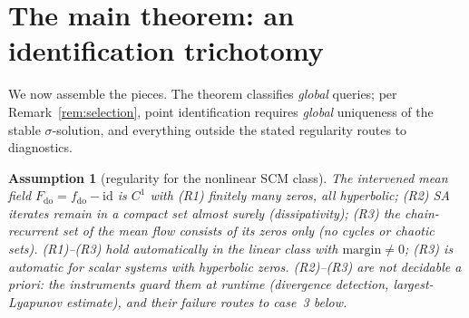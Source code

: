 \documentclass[pmlr]{jmlr}
\newtheorem{assumption}[theorem]{Assumption}
\newcommand{\doop}{\mathrm{do}}
\newcommand{\margin}{\mathrm{margin}}
\begin{document}
\section{The main theorem: an identification trichotomy}\label{sec:main}

We now assemble the pieces. The theorem classifies \emph{global} queries; per
Remark~\ref{rem:selection}, point identification requires \emph{global} uniqueness of the stable
$\sigma$-solution, and everything outside the stated regularity routes to diagnostics.

\begin{assumption}[regularity for the nonlinear SCM class]\label{ass:R}
The intervened mean field $F_{\doop} = f_{\doop} - \mathrm{id}$ is $C^1$ with (R1) finitely many
zeros, all hyperbolic; (R2) SA iterates remain in a compact set almost surely (dissipativity);
(R3) the chain-recurrent set of the mean flow consists of its zeros only (no cycles or chaotic
sets). (R1)--(R3) hold automatically in the linear class with $\margin \neq 0$; (R3) is automatic for
scalar systems with hyperbolic zeros. (R2)--(R3) are not decidable a priori: the instruments
guard them at runtime (divergence detection, largest-Lyapunov estimate), and their failure
routes to case~3 below.
\end{assumption}
\end{document}
